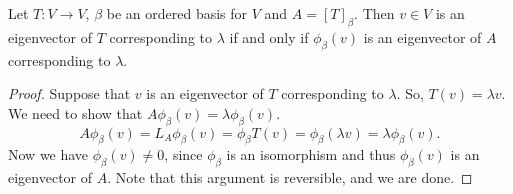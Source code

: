 \begin{prop}
    Let \( T: V \to V  \), \( \beta \) be an ordered basis for \( V  \) and \( A = [T]_{\beta}  \). Then \( v \in V  \) is an eigenvector of \( T  \) corresponding to \( \lambda  \) if and only if \( {\phi}_{\beta}(v) \) is an eigenvector of \( A  \) corresponding to \( \lambda  \). 
\end{prop}
\begin{proof}
Suppose that \( v  \) is an eigenvector of \( T  \) corresponding to \( \lambda  \). So, \( T(v) = \lambda v  \). We need to show that \( A {\phi}_{\beta}(v) = \lambda {\phi}_{\beta}(v) \). 
\[  A {\phi}_{\beta}(v) = {L}_{A}{\phi}_{\beta}(v) = {\phi}_{\beta}T(v) = {\phi}_{\beta} (\lambda v) = \lambda {\phi}_{\beta}(v).      \]
Now we have \( {\phi}_{\beta}(v) \neq 0  \), since \( {\phi}_{\beta} \) is an isomorphism and thus \( {\phi}_{\beta}(v)  \) is an eigenvector of \( A  \). Note that this argument is reversible, and we are done.
\end{proof}


